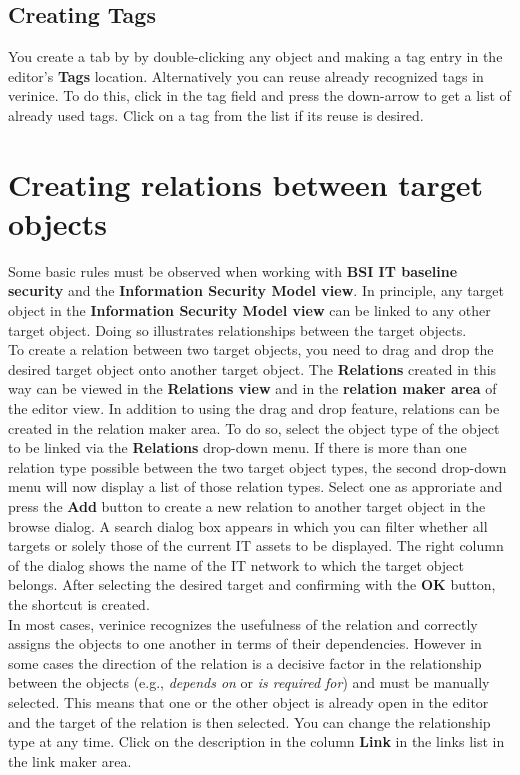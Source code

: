 \documentclass[a4paper,10pt]{book}
\begin{document}
\subsection{Creating Tags}
You create a tab by by double-clicking any object and making a tag entry in the editor's \textbf{Tags} location. Alternatively you can reuse already recognized tags in verinice. To do this, click in the tag field and press the down-arrow to get a list of already used tags. Click on a tag from the list if its reuse is desired.

\section{Creating relations between target objects}
\label{sec:bsiView_dd}
Some basic rules must be observed when working with \textbf{BSI IT
  baseline security} and the \textbf{Information Security Model view}.
In principle, any target object in the \textbf{Information Security
  Model view} can be linked to any other target object.  Doing so
illustrates relationships between the target objects.
\newline\\
To create a relation between two target objects, you need to drag and
drop the desired target object onto another target object.  The
\textbf{Relations} created in this way can be viewed in the
\textbf{Relations view} and in the \textbf{relation maker area} of the
editor view.  In addition to using the drag and drop feature,
relations can be created in the relation maker area.  To do so, select
the object type of the object to be linked via the \textbf{Relations}
drop-down menu. If there is more than one relation type possible
between the two target object types, the second drop-down menu will
now display a list of those relation types. Select one as approriate
and press the \textbf{Add} button to create a new relation to another
target object in the browse dialog.  A search dialog box appears in
which you can filter whether all targets or solely those of the
current IT assets to be displayed.  The right column of the dialog
shows the name of the IT network to which the target object belongs.
After selecting the desired target and confirming with the \textbf{OK}
button, the shortcut is created.
\newline\\
In most cases, verinice recognizes the usefulness of the relation and
correctly assigns the objects to one another in terms of their
dependencies.  However in some cases the direction of the relation is
a decisive factor in the relationship between the objects (e.g., {\em
  depends on} or {\em is required for}) and must be manually selected.
This means that one or the other object is already open in the editor
and the target of the relation is then selected.  You can change the
relationship type at any time.  Click on the description in the column
\textbf{Link} in the links list in the link maker area.
\end{document}
